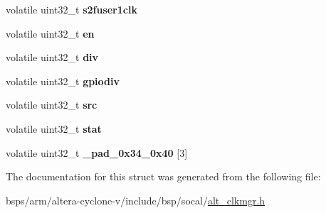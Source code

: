 \begin{DoxyCompactItemize}
volatile uint32\+\_\+t {\bfseries s2fuser1clk}
\item 
\mbox{\label{structALT__CLKMGR__PERPLL__raw__s_ac6d91c60d3c1675bd3e417c8c5d5dd46}} 
volatile uint32\+\_\+t {\bfseries en}
\item 
\mbox{\label{structALT__CLKMGR__PERPLL__raw__s_a1e39aa49e34c9303538cc449fc75d37d}} 
volatile uint32\+\_\+t {\bfseries div}
\item 
\mbox{\label{structALT__CLKMGR__PERPLL__raw__s_aa2a1182c44ddc879baff14e4a9ec311c}} 
volatile uint32\+\_\+t {\bfseries gpiodiv}
\item 
\mbox{\label{structALT__CLKMGR__PERPLL__raw__s_a3c86ffa680790d9adef65b92cc2d7b3c}} 
volatile uint32\+\_\+t {\bfseries src}
\item 
\mbox{\label{structALT__CLKMGR__PERPLL__raw__s_a548189282be6e0c756b7142f8798fc74}} 
volatile uint32\+\_\+t {\bfseries stat}
\item 
\mbox{\label{structALT__CLKMGR__PERPLL__raw__s_a921235ea92410da1b8d18e01bcb546e8}} 
volatile uint32\+\_\+t {\bfseries \+\_\+pad\+\_\+0x34\+\_\+0x40} \mbox{[}3\mbox{]}
\end{DoxyCompactItemize}


The documentation for this struct was generated from the following file\+:\begin{DoxyCompactItemize}
\item 
bsps/arm/altera-\/cyclone-\/v/include/bsp/socal/\mbox{\hyperlink{alt__clkmgr_8h}{alt\+\_\+clkmgr.\+h}}\end{DoxyCompactItemize}
